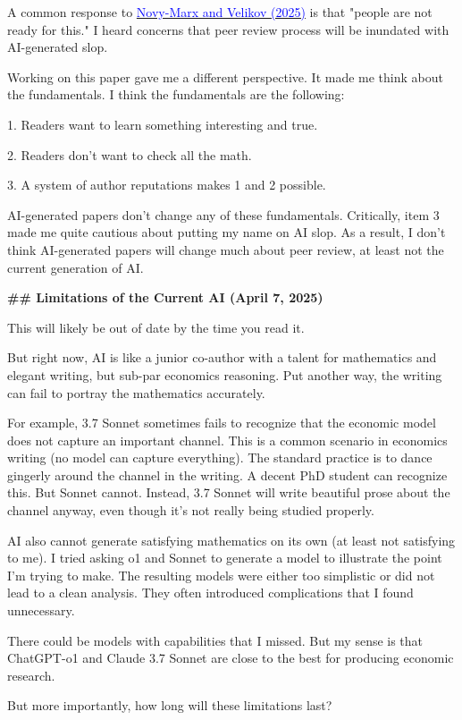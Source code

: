 \begin{mdframed}[linewidth=1pt, linecolor=black]
A common response to \href{https://www.nber.org/papers/w33363}{\textcolor{blue}{Novy-Marx and Velikov (2025)}} is that "people are not ready for this." I heard concerns that peer review process will be inundated with AI-generated slop.

Working on this paper gave me a different perspective. It made me think about the fundamentals. I think the fundamentals are the following:

1. Readers want to learn something interesting and true.

2. Readers don't want to check all the math.

3. A system of author reputations makes 1 and 2 possible.

AI-generated papers don't change any of these fundamentals.  Critically, item 3 made me quite cautious about putting my name on AI slop. As a result, I don't think AI-generated papers will change much about peer review, at least not the current generation of AI.

\textbf{\textcolor{red!70!black}{\#\# Limitations of the Current AI (April 7, 2025)}}

This will likely be out of date by the time you read it.

But right now, AI is like a junior co-author with a talent for mathematics and elegant writing, but sub-par economics reasoning. Put another way, the writing can fail to portray the mathematics accurately.

For example, 3.7 Sonnet sometimes fails to recognize that the economic model does not capture an important channel. This is a common scenario in economics writing (no model can capture everything). The standard practice is to dance gingerly around the channel in the writing. A decent PhD student can recognize this. But Sonnet cannot. Instead, 3.7 Sonnet will write beautiful prose about the channel anyway, even though it's not really being studied properly. 

AI also cannot generate satisfying mathematics on its own (at least not satisfying to me). I tried asking o1 and Sonnet to generate a model to illustrate the point I'm trying to make. The resulting models were either too simplistic or did not lead to a clean analysis. They often introduced complications that I found unnecessary. 

There could be models with capabilities that I missed. But my sense is that ChatGPT-o1 and Claude 3.7 Sonnet are close to the best for producing economic research.

But more importantly, how long will these limitations last? 


\end{mdframed}
